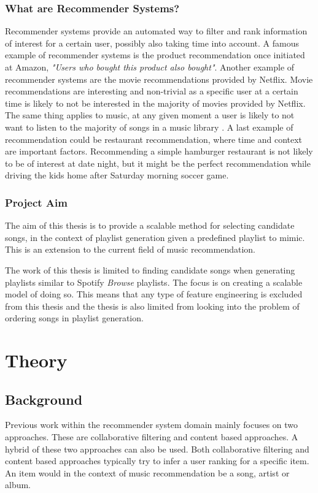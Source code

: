 \documentclass[a4paper,11pt]{kth-mag}
\begin{document}
\section{What are Recommender Systems?}
Recommender systems provide an automated way to filter and rank information of interest for a certain user, possibly also taking time into account. A famous example of recommender systems is the product recommendation once initiated at Amazon, \textit{"Users who bought this product also bought"}. Another example of recommender systems are the movie recommendations provided by Netflix. Movie recommendations are interesting and non-trivial as a specific user at a certain time is likely to not be interested in the majority of movies provided by Netflix. The same thing applies to music, at any given moment a user is likely to not want to listen to the majority of songs in a music library . A last example of recommendation could be restaurant recommendation, where time and context are important factors. Recommending a simple hamburger restaurant is not likely to be of interest at date night, but it might be the perfect recommendation while driving the kids home after Saturday morning soccer game.

\section{Project Aim}
The aim of this thesis is to provide a scalable method for selecting candidate songs, in the context of playlist generation given a predefined playlist to mimic. This is an extension to the current field of music recommendation.  

The work of this thesis is limited to finding candidate songs when generating playlists similar to Spotify \textit{Browse} playlists. The focus is on creating a scalable model of doing so. This means that any type of feature engineering is excluded from this thesis and the thesis is also limited from looking into the problem of ordering songs in playlist generation. 

\part{Theory}

\chapter{Background}

Previous work within the recommender system domain mainly focuses on two approaches. These are collaborative filtering and content based approaches. A hybrid of these two approaches can also be used. Both collaborative filtering and content based approaches typically try to infer a user ranking for a specific item\cite{melville2002content}. An item would in the context of music recommendation be a song, artist or album.
\end{document}
